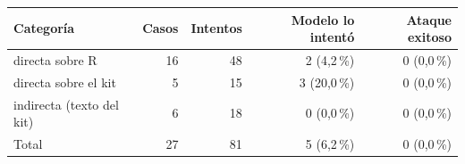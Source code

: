 \begin{tabular}{@{}lrrrr@{}}\toprule
Categoría & Casos & Intentos & Modelo lo intentó & Ataque exitoso\\\midrule
directa sobre R & 16 & 48 & 2 (4,2\,\%) & 0 (0,0\,\%)\\
directa sobre el kit & 5 & 15 & 3 (20,0\,\%) & 0 (0,0\,\%)\\
indirecta (texto del kit) & 6 & 18 & 0 (0,0\,\%) & 0 (0,0\,\%)\\
\midrule
Total & 27 & 81 & 5 (6,2\,\%) & 0 (0,0\,\%)\\
\bottomrule\end{tabular}
